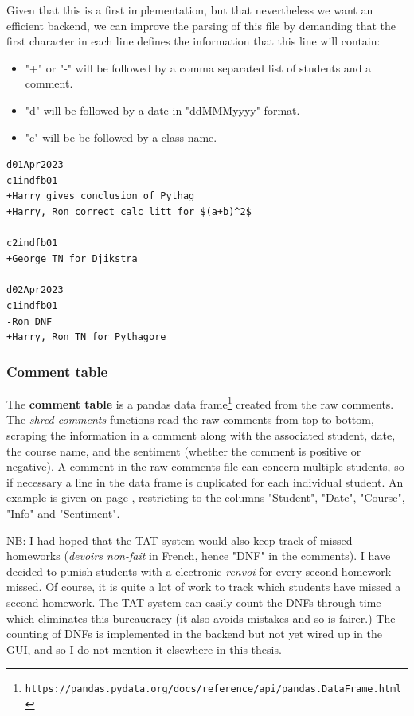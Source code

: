 \documentclass[10pt]{article}
\begin{document}
Given that this is a first implementation, but that nevertheless we want an efficient backend, we can improve the parsing of this file by demanding that the first character in each line defines the information that this line will contain:

\begin{itemize}
\item "+" or "-" will be followed by a comma separated list of students and a comment.
\item "d" will be followed by a date in "ddMMMyyyy" format.
\item "c" will be be followed by a class name.
\end{itemize}

\begin{tcolorbox}[title = comments\_file\_v1.1.txt]
\texttt{d01Apr2023\\c1indfb01\\+Harry gives conclusion of Pythag\\+Harry, Ron correct calc litt for \$(a+b)\textasciicircum2\$\\\\c2indfb01\\+George TN for Djikstra \\\\ d02Apr2023\\c1indfb01\\-Ron DNF\\+Harry, Ron TN for Pythagore}
\end{tcolorbox}

\subsubsection{Comment table}

The \textbf{comment table} is a pandas data frame\footnote{\texttt{https://pandas.pydata.org/docs/reference/api/pandas.DataFrame.html}} created from the raw comments. The \emph{shred comments} functions read the raw comments from top to bottom, scraping the information in a comment along with the associated student, date, the course name, and the sentiment (whether the comment is positive or negative). A comment in the raw comments file can concern multiple students, so if necessary a line in the data frame is duplicated for each individual student. An example is given on page \pageref{comments_table}, restricting to the columns "Student", "Date", "Course", "Info" and "Sentiment".

\begin{tcolorbox}
NB: I had hoped that the TAT system would also keep track of missed homeworks (\emph{devoirs non-fait} in French, hence "DNF" in the comments). I have decided to punish students with a electronic \emph{renvoi} for every second homework missed. Of course, it is quite a lot of work to track which students have missed a second homework. The TAT system can easily count the DNFs through time which eliminates this bureaucracy (it also avoids mistakes and so is fairer.) The counting of DNFs is implemented in the backend but not yet wired up in the GUI, and so I do not mention it elsewhere in this thesis.
\end{tcolorbox}
\end{document}
